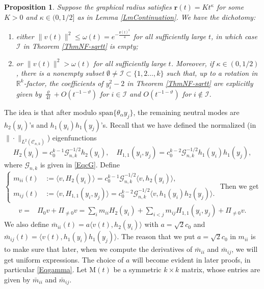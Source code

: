 \documentclass[11pt]{amsart}
\numberwithin{equation}{section}
\newtheorem{proposition}[theorem]{Proposition}
\numberwithin{equation}{section}
\newcommand{\br}{\mathbf{r}}
\newcommand{\cC}{\mathcal{C}}
\newcommand{\cG}{\mathcal{G}}
\newcommand{\R}{\mathbb{R}}
\begin{document}
	\begin{proposition}\label{LmCoefficient}
		Suppose the graphical radius satisfies $\br(t)=Kt^{\kappa}$ for some $K>0$ and $\kappa\in (0,1/2]$ as in Lemma \ref{LmContinuation}. We have the dichotomy:
		\begin{enumerate}
			\item either $\|v(t)\|^2\leq \omega(t)=e^{-\frac{\br(t)^2}{4}}$ for all sufficiently large $t$, in which case $\mathcal I$ in Theorem \ref{ThmNF-sqrtt} is empty;
			\item or $\|v(t)\|^2> \omega(t)$ for all sufficiently large $t$. Moreover, if $\kappa\in(0,1/2)$, there is a nonempty subset $\emptyset\neq \mathcal I\subset\{1,2\ldots, k\}$ such that, up to a rotation in $\R^k$-factor, the coefficients of $y_i^2-2$ in Theorem \ref{ThmNF-sqrtt} are explicitly given by $\frac{\varrho}{4t}+O(t^{-1-\vartheta})$ for $i\in \mathcal I$ and $O(t^{-1-\vartheta})$ for $i\notin \mathcal I.$
		\end{enumerate}
		
	\end{proposition}
	
	
	The idea is that after modulo $\text{span}\{\theta_\alpha y_j\}$, the remaining neutral modes are $h_2(y_i)$'s and $h_1(y_i)h_1(y_j)$'s. Recall that we have defined the normalized (in $\|\cdot\|_{L^2(\cC_{n,k})}$) eigenfunctions $$H_2(y_i)=c_0^{k-1}\cG_{n,k}^{-1/2}h_2(y_i),\quad H_{1,1}(y_i,y_j)=c_0^{k-2}\cG_{n,k}^{-1/2}h_1(y_i)h_1(y_j),$$ where $\cG_{n,k}$ is given in \eqref{EqcG}.
	Define 
	$
	\begin{cases}
		m_{ii}(t)&:=\langle v,H_2(y_i)\rangle
		=
		c_0^{k-1}\cG_{n,k}^{-1/2}\langle v,h_2(y_i)\rangle,\\
		m_{ij}(t)&:=\langle v,H_{1,1}(y_i,y_j)\rangle
		= c_0^{k-2}\cG_{n,k}^{-1/2}\langle v, h_1(y_i)h_2(y_j)\rangle.        
	\end{cases}$
	Then we get $$
	\begin{aligned}
		v=&\Pi_{0}v+\Pi_{\neq 0}v=\sum_i m_{ii}H_2(y_i)+\sum_{i< j}m_{ij}H_{1,1}(y_i,y_j)+\Pi_{\neq 0}v.
	\end{aligned}
	$$
	We also define $\bar m_{ii}(t)=a\langle v(t),h_2(y_i)\rangle$ with $a=\sqrt{2}c_0$ and $\bar m_{ij}(t)=\langle v(t), h_1(y_i)h_1(y_j)\rangle$. The reason that we put $a=\sqrt{2}c_0$ in $m_{ii}$ is to make sure that later, when we compute the derivatives of $\bar{m}_{ii}$ and $\bar m_{ij}$, we will get uniform expressions. The choice of $a$ will become evident in later proofs, in particular \eqref{Eqgamma}. Let $\mathrm{M}(t)$ be a symmetric $k\times k$ matrix, whose entries are given by $\bar{m}_{ii}$ and $\bar{m}_{ij}$. 
	
\end{document}
